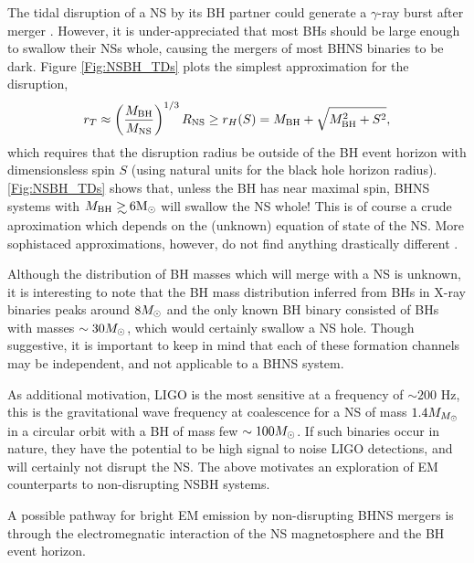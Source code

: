 The tidal disruption of a NS by its BH partner could generate a $\gamma$-ray
burst after merger \citep{NPP:NSBH_GRB:1992}. However, it is under-appreciated
that most BHs should be large enough to swallow their NSs
whole, causing the mergers of most BHNS binaries to be dark. Figure 
\ref{Fig:NSBH_TDs} plots the simplest approximation for the disruption,
\begin{equation}
 r_T \approx \left( \frac{M_{\rm{BH}} }{ M_{\rm{NS}}} \right)^{1/3} R_{\rm{NS}} \geq r_H(S) 
 = M_{\rm{BH}} + \sqrt{M^2_{\rm{BH}} + S^2},
\end{equation}
which requires that the disruption radius be outside of the BH event horizon
with dimensionsless spin $S$ (using natural units for the black hole horizon
radius). \ref{Fig:NSBH_TDs} shows that, unless the BH has near maximal spin,
BHNS systems with $M_{\rm{BH}} \gsim 6 \msun$ will swallow the NS whole! This
is of course a crude aproximation which depends on the (unknown) equation of
state of the NS. More sophistaced approximations, however, do not find anything
drastically different \citep[\emph{e.g.}][]{Foucart:2012}.


Although the distribution of BH masses which will merge with
a NS is unknown, it is interesting to note that the BH mass distribution
inferred from BHs in X-ray binaries peaks around $8 {M_{\odot}}$ \citep{Ozel:2010}
and the only known BH binary consisted of BHs with masses $\sim 30 {M_{\odot}}$, which
would certainly swallow a NS hole. Though suggestive, it is important to keep
in mind that each of these formation channels may be independent, and not
applicable to a BHNS system.

As additional motivation, LIGO is the most sensitive at a frequency of $\sim
200$ Hz, this is the gravitational wave frequency at coalescence for a NS of
mass $1.4 M_{{M_{\odot}}}$ in a circular orbit with a BH of mass few $\sim100
{M_{\odot}}$. If such binaries occur in nature, they have the potential to be high
signal to noise LIGO detections, and will certainly not disrupt the NS. The
above motivates an exploration of EM counterparts to non-disrupting NSBH
systems.


A possible pathway for bright EM emission by non-disrupting BHNS mergers is
through the electromegnatic interaction of the NS magnetosphere and the BH
event horizon. 

